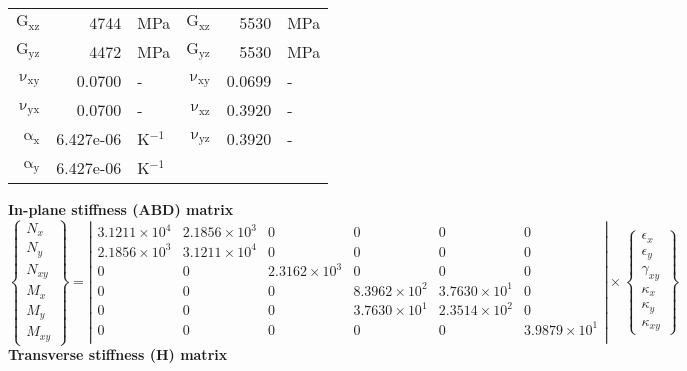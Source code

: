 \begin{table}[!htbp]
\begin{tabular}[t]{rrlrrl}
      $\mathrm{G_{xz}}$ &     4744 & MPa & $\mathrm{G_{xz}}$ &     5530 & MPa\\
      $\mathrm{G_{yz}}$ &     4472 & MPa &  $\mathrm{G_{yz}}$ &     5530 & MPa\\
      $\mathrm{\nu_{xy}}$ & 0.0700 &- &$\mathrm{\nu_{xy}}$ & 0.0699 &-\\
      $\mathrm{\nu_{yx}}$ & 0.0700 &- & $\mathrm{\nu_{xz}}$ & 0.3920 &-\\
      $\mathrm{\alpha_x}$ & 6.427e-06 & K$^{-1}$ &$\mathrm{\nu_{yz}}$ & 0.3920 &-\\
      $\mathrm{\alpha_y}$ & 6.427e-06 & K$^{-1}$\\
      \bottomrule
    \end{tabular}
  \vbox{
    \vbox{\small\textbf{In-plane stiffness (ABD) matrix}\\[-3mm]
      \tiny\[\left\{\begin{array}{c}
          N_x\\ N_y\\ N_{xy}\\ M_x\\ M_y\\ M_{xy}
        \end{array}\right\} = 
      \left|\begin{array}{cccccc}
           3.1211\times 10^{4} &  2.1856\times 10^{3} & 0 & 0 & 0 & 0\\
           2.1856\times 10^{3} &  3.1211\times 10^{4} & 0 & 0 & 0 & 0\\
          0 & 0 &  2.3162\times 10^{3} & 0 & 0 & 0\\
          0 & 0 & 0 &  8.3962\times 10^{2} &  3.7630\times 10^{1} & 0\\
          0 & 0 & 0 &  3.7630\times 10^{1} &  2.3514\times 10^{2} & 0\\
          0 & 0 & 0 & 0 & 0 &  3.9879\times 10^{1}\\
          \end{array}\right| \times
        \left\{\begin{array}{c}
            \epsilon_x\\[2pt] \epsilon_y\\[2pt] \gamma_{xy}\\[2pt]
            \kappa_x\\[2pt] \kappa_y\\[2pt] \kappa_{xy}
          \end{array}\right\}\]
    }
    \vbox{\small\textbf{Transverse stiffness (H) matrix}\\[-2mm]
}}
\end{table}
